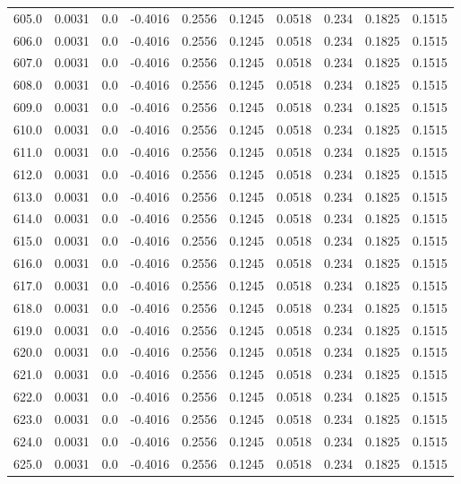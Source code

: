\begin{longtable}{lrrrrrrrrr}
605.0 & 0.0031 & 0.0 & -0.4016 & 0.2556 & 0.1245 & 0.0518 & 0.234 & 0.1825 & 0.1515 \\
606.0 & 0.0031 & 0.0 & -0.4016 & 0.2556 & 0.1245 & 0.0518 & 0.234 & 0.1825 & 0.1515 \\
607.0 & 0.0031 & 0.0 & -0.4016 & 0.2556 & 0.1245 & 0.0518 & 0.234 & 0.1825 & 0.1515 \\
608.0 & 0.0031 & 0.0 & -0.4016 & 0.2556 & 0.1245 & 0.0518 & 0.234 & 0.1825 & 0.1515 \\
609.0 & 0.0031 & 0.0 & -0.4016 & 0.2556 & 0.1245 & 0.0518 & 0.234 & 0.1825 & 0.1515 \\
610.0 & 0.0031 & 0.0 & -0.4016 & 0.2556 & 0.1245 & 0.0518 & 0.234 & 0.1825 & 0.1515 \\
611.0 & 0.0031 & 0.0 & -0.4016 & 0.2556 & 0.1245 & 0.0518 & 0.234 & 0.1825 & 0.1515 \\
612.0 & 0.0031 & 0.0 & -0.4016 & 0.2556 & 0.1245 & 0.0518 & 0.234 & 0.1825 & 0.1515 \\
613.0 & 0.0031 & 0.0 & -0.4016 & 0.2556 & 0.1245 & 0.0518 & 0.234 & 0.1825 & 0.1515 \\
614.0 & 0.0031 & 0.0 & -0.4016 & 0.2556 & 0.1245 & 0.0518 & 0.234 & 0.1825 & 0.1515 \\
615.0 & 0.0031 & 0.0 & -0.4016 & 0.2556 & 0.1245 & 0.0518 & 0.234 & 0.1825 & 0.1515 \\
616.0 & 0.0031 & 0.0 & -0.4016 & 0.2556 & 0.1245 & 0.0518 & 0.234 & 0.1825 & 0.1515 \\
617.0 & 0.0031 & 0.0 & -0.4016 & 0.2556 & 0.1245 & 0.0518 & 0.234 & 0.1825 & 0.1515 \\
618.0 & 0.0031 & 0.0 & -0.4016 & 0.2556 & 0.1245 & 0.0518 & 0.234 & 0.1825 & 0.1515 \\
619.0 & 0.0031 & 0.0 & -0.4016 & 0.2556 & 0.1245 & 0.0518 & 0.234 & 0.1825 & 0.1515 \\
620.0 & 0.0031 & 0.0 & -0.4016 & 0.2556 & 0.1245 & 0.0518 & 0.234 & 0.1825 & 0.1515 \\
621.0 & 0.0031 & 0.0 & -0.4016 & 0.2556 & 0.1245 & 0.0518 & 0.234 & 0.1825 & 0.1515 \\
622.0 & 0.0031 & 0.0 & -0.4016 & 0.2556 & 0.1245 & 0.0518 & 0.234 & 0.1825 & 0.1515 \\
623.0 & 0.0031 & 0.0 & -0.4016 & 0.2556 & 0.1245 & 0.0518 & 0.234 & 0.1825 & 0.1515 \\
624.0 & 0.0031 & 0.0 & -0.4016 & 0.2556 & 0.1245 & 0.0518 & 0.234 & 0.1825 & 0.1515 \\
625.0 & 0.0031 & 0.0 & -0.4016 & 0.2556 & 0.1245 & 0.0518 & 0.234 & 0.1825 & 0.1515 \\

\end{longtable}
